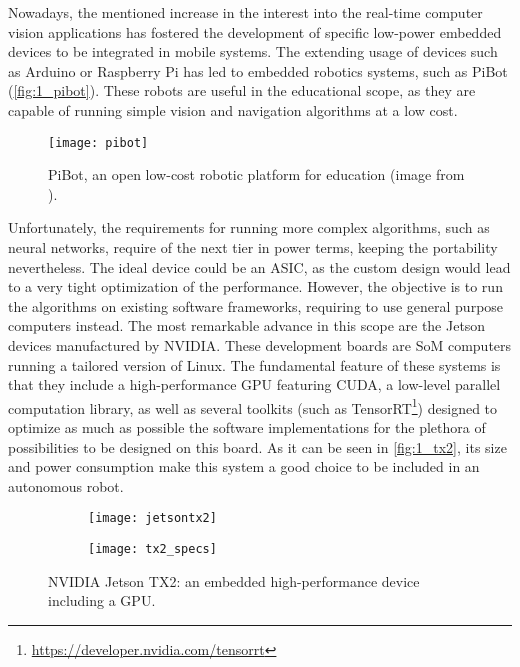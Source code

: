 Nowadays, the mentioned increase in the interest into the real-time computer vision applications has fostered the development of specific low-power embedded devices to be integrated in mobile systems. The extending usage of devices such as Arduino or Raspberry Pi has led to embedded robotics systems, such as PiBot \cite{pibot} (\autoref{fig:1_pibot}). These robots are useful in the educational scope, as they are capable of running simple vision and navigation algorithms at a low cost.\\
\begin{figure}[h]
	\centering
	\texttt{[image: pibot]}
	\caption{PiBot, an open low-cost robotic platform for education (image from \cite{pibot}).}
	\label{fig:1_pibot}
\end{figure}
Unfortunately, the requirements for running more complex algorithms, such as neural networks, require of the next tier in power terms, keeping the portability nevertheless. The ideal device could be an ASIC, as the custom design would lead to a very tight optimization of the performance. However, the objective is to run the algorithms on existing software frameworks, requiring to use general purpose computers instead. The most remarkable advance in this scope are the Jetson devices manufactured by NVIDIA. These development boards are SoM computers running a tailored version of Linux. The fundamental feature of these systems is that they include a high-performance GPU featuring CUDA, a low-level parallel computation library, as well as several toolkits (such as TensorRT\footnote{\url{https://developer.nvidia.com/tensorrt}}) designed to optimize as much as possible the software implementations for the plethora of possibilities to be designed on this board. As it can be seen in \autoref{fig:1_tx2}, its size and power consumption make this system a good choice to be included in an autonomous robot. 
\begin{figure}[h!]
	\begin{subfigure}[h]{0.45\linewidth}
		\centering
		\texttt{[image: jetsontx2]}

	\end{subfigure}
	\begin{subfigure}[h]{0.45\linewidth}
		\centering
		\texttt{[image: tx2\_specs]}
	\end{subfigure}
	\caption{NVIDIA Jetson TX2: an embedded high-performance device including a GPU.}
	\label{fig:1_tx2}
\end{figure}


